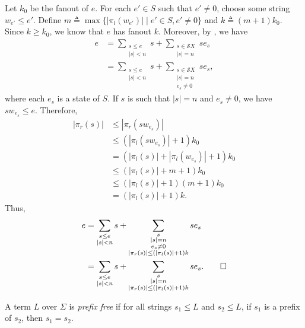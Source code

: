 \documentclass[a4paper,UKenglish,cleveref, autoref, thm-restate]{lipics-v2021}
\begin{document}
\begin{proofEnd}
  Let $k_0$ be the fanout of $e$.  For each $e'  \in  S$ such that $e'  \neq  0$, choose
  some string $w_{e'}  \leq  e'$.  Define
  $m  \triangleq  \max\{| \pi _l(w_{e'})|  \mid  e'  \in  S, e'  \neq  0 \}$ and $k \triangleq (m+1)k_0$. Since
  $k  \geq  k_0$, we know that $e$ has fanout $k$.  Moreover, by
  , we have
  \begin{align*}
    e
    & =  \sum _{\substack{s  \leq  e\\ |s| < n}} s + %
     \sum _{\substack{s  \in  \mathcal{S}X \\ |s|=n}} se_s \\
    & =  \sum _{\substack{s  \leq  e \\ |s| < n}} s + %
     \sum _{\substack{s  \in  \mathcal{S}X \\ |s|=n \\ e_s  \neq  0}}se_s,
  \end{align*}
  where each $e_s$ is a state of $S$.  If $s$ is such that $|s|=n$ and
  $e_s  \neq  0$, we have $sw_{e_s}  \leq  e$.  Therefore,
  \begin{align*}
    | \pi _r(s)|
    &  \leq  | \pi _r(sw_{e_s})| \\
    &  \leq  (| \pi _l(sw_{e_s})|+1)k_0 \\
    & = (| \pi _l(s)|+| \pi _l(w_{e_s})|+1)k_0 \\
    &  \leq  (| \pi _l(s)|+m+1)k_0 \\
    &  \leq  (| \pi _l(s)|+1)(m+1)k_0 \\
    & = (| \pi _l(s)|+1)k.
  \end{align*}
  Thus,
  \begin{align*}
    e
    & =  \sum _{\substack{s  \leq  e \\ |s| < n}} s + %
     \sum _{\substack{s \\ |s|=n \\ e_s  \neq  0 \\ | \pi _r(s)| \leq (| \pi _l(s)|+1)k} }se_s \\
    & =  \sum _{\substack{s  \leq  e \\ |s| < n}} s + %
     \sum _{\substack{s \\ |s|=n \\ | \pi _r(s)| \leq (| \pi _l(s)|+1)k}} se_s. \qedhere
  \end{align*}
\end{proofEnd}

\begin{definition}
  \label{def:prefix-free}
  A term $L$ over $ \Sigma $ is \emph{prefix free} if for all strings $s_1  \leq  L$ and
  $s_2  \leq  L$, if $s_1$ is a prefix of $s_2$, then $s_1 = s_2$.
\end{definition}
\end{document}

